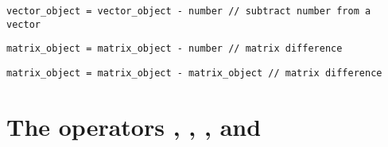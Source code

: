 \documentclass{admbmanual}
\begin{document}
\begin{lstlisting}
vector_object = vector_object - number // subtract number from a vector 
\end{lstlisting} 
\begin{lstlisting}
matrix_object = matrix_object - number // matrix difference 
\end{lstlisting}
\begin{lstlisting}
matrix_object = matrix_object - matrix_object // matrix difference 
\end{lstlisting}


\section{The operators \ttpluseq,  \ttminuseq, \ttmultiplyeq, and \ttdivideeq} 
\end{document}
